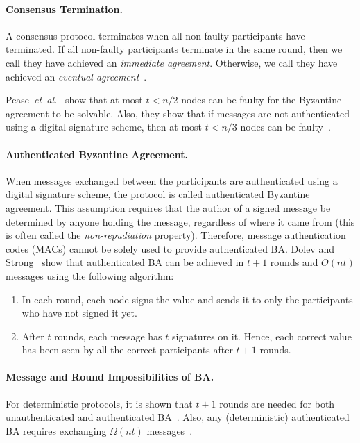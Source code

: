 \documentclass[11pt]{article}
\newcommand{\etal}{\textit{et~al.}}
\theoremstyle{mytheoremstyle}
\begin{document}
\paragraph{Consensus Termination.} A consensus protocol terminates when all non-faulty participants have terminated. If all non-faulty participants terminate in the same round, then we call they have achieved an \emph{immediate agreement}. Otherwise, we call they have achieved an \emph{eventual agreement}~\cite{fischer}.

Pease~\etal~\cite{pease80reaching} show that at most ${t<n/2}$ nodes can be faulty for the Byzantine agreement to be solvable. Also, they show that if messages are not authenticated using a digital signature scheme, then at most ${t<n/3}$ nodes can be faulty~\cite{pease80reaching}.

\paragraph{Authenticated Byzantine Agreement.}
When messages exchanged between the participants are authenticated using a digital signature scheme, the protocol is called authenticated Byzantine agreement. This assumption requires that the author of a signed message be determined by anyone holding the message, regardless of where it came from (this is often called the \emph{non-repudiation} property). Therefore, message authentication codes (MACs) cannot be solely used to provide authenticated BA. Dolev and Strong~\cite{Dolev:Strong:83} show that authenticated BA can be achieved in $t+1$ rounds and $O(nt)$ messages using the following algorithm:

\begin{enumerate}
	\item In each round, each node signs the value and sends it to only the participants who have not signed it yet.
	\item After $t$ rounds, each message has $t$ signatures on it. Hence, each correct value has been seen by all the correct participants after $t+1$ rounds.
\end{enumerate}

\paragraph{Message and Round Impossibilities of BA.}
For deterministic protocols, it is shown that $t+1$ rounds are needed for both unauthenticated and authenticated BA~\cite{FischerLynch81,Dolev:1982:STOC}. Also, any (deterministic) authenticated BA requires exchanging $\Omega(nt)$ messages~\cite{Dolev:Reischuk:82}.
\end{document}
